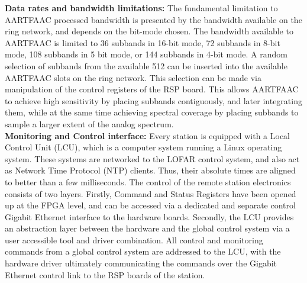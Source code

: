 \documentclass{ws-jai}
\begin{document}
\noindent  \textbf {Data  rates  and bandwidth  limitations:  } The  fundamental
limitation  to  AARTFAAC  processed  bandwidth is  presented  by  the  bandwidth
available  on  the ring  network,  and  depends  on  the bit-mode  chosen.   The
bandwidth available  to AARTFAAC is  limited to 36  subbands in 16-bit  mode, 72
subbands in  8-bit mode, 108 subbands  in 5 bit  mode, or 144 subbands  in 4-bit
mode.  A  random selection of  subbands from the  available 512 can  be inserted
into the  available AARTFAAC slots on  the ring network.  This  selection can be
made via  manipulation of the control  registers of the RSP  board.  This allows
AARTFAAC to achieve high sensitivity by placing subbands contiguously, and later
integrating them, while at the same  time achieving spectral coverage by placing
subbands to sample a larger extent of the analog spectrum.\\


\noindent \textbf {Monitoring and Control  interface:} Every station is equipped
with a  Local Control  Unit (LCU), which  is a computer  system running  a Linux
operating system.  These systems are networked  to the LOFAR control system, and
also act as Network Time Protocol  (NTP) clients. Thus, their absolute times are
aligned to  better than a  few milliseconds. The  control of the  remote station
electronics consists of  two layers. Firstly, Command and  Status Registers have
been  opened up  at the  FPGA level,  and can  be accessed  via a  dedicated and
separate control  Gigabit Ethernet interface  to the hardware  boards. Secondly,
the  LCU provides  an  abstraction layer  between the  hardware  and the  global
control system  via a user accessible  tool and driver combination.  All control
and monitoring commands  from a global control system are  addressed to the LCU,
with the hardware driver ultimately  communicating the commands over the Gigabit
Ethernet control link to the RSP boards of the station.
\end{document}
